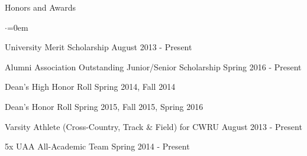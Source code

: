\documentclass{resume} %
\begin{document}

\begin{rSection}{Honors and Awards}
\begin{list}{$\cdot$}{\leftmargin=0em}
\item University Merit Scholarship \hfill August 2013 - Present
\vspace{-0.5em}
\item Alumni Association Outstanding Junior/Senior Scholarship \hfill Spring 2016 - Present
\vspace{-0.5em}
\item Dean's High Honor Roll \hfill Spring 2014, Fall 2014
\vspace{-0.5em}
\item Dean's Honor Roll \hfill Spring 2015, Fall 2015, Spring 2016
\vspace{-0.5em}
\item Varsity Athlete (Cross-Country, Track \& Field) for CWRU \hfill{August 2013 - Present}
\vspace{-0.5em}
\item 5x UAA All-Academic Team \hfill{Spring 2014 - Present}
\vspace{-0.5em}
\end{list}


\end{rSection}

\end{document}
